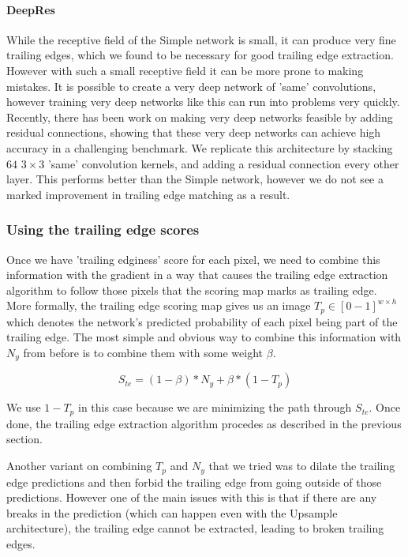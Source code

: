 
\paragraph{DeepRes}
While the receptive field of the Simple network is small, it can produce very fine trailing edges, which we found to be necessary for good trailing edge extraction.
However with such a small receptive field it can be more prone to making mistakes.
It is possible to create a very deep network of 'same' convolutions, however training very deep networks like this can run into problems very quickly.
Recently, there has been work on making very deep networks feasible by adding residual connections\cite{he2015deep}, showing that these very deep networks can achieve high accuracy in a challenging benchmark.
We replicate this architecture by stacking $64$ $3\times3$ 'same' convolution kernels, and adding a residual connection every other layer.
This performs better than the Simple network, however we do not see a marked improvement in trailing edge matching as a result.

\subsubsection{Using the trailing edge scores}

Once we have 'trailing edginess' score for each pixel, we need to combine this information with the gradient in a way that causes the trailing edge extraction algorithm to follow those pixels that the scoring map marks as trailing edge.
More formally, the trailing edge scoring map gives us an image $T_p \in [0-1]^{w \times h}$ which denotes the network's predicted probability of each pixel being part of the trailing edge.
The most simple and obvious way to combine this information with $N_y$ from before is to combine them with some weight $\beta$.

\begin{equation}
S_{te} = (1 - \beta)*N_y + \beta*(1 - T_p)
\end{equation}

We use $1 - T_p$ in this case because we are minimizing the path through $S_{te}$.
Once done, the trailing edge extraction algorithm procedes as described in the previous section.

Another variant on combining $T_p$ and $N_y$ that we tried was to dilate the trailing edge predictions and then forbid the trailing edge from going outside of those predictions.
However one of the main issues with this is that if there are any breaks in the prediction (which can happen even with the Upsample architecture), the trailing edge cannot be extracted, leading to broken trailing edges.

